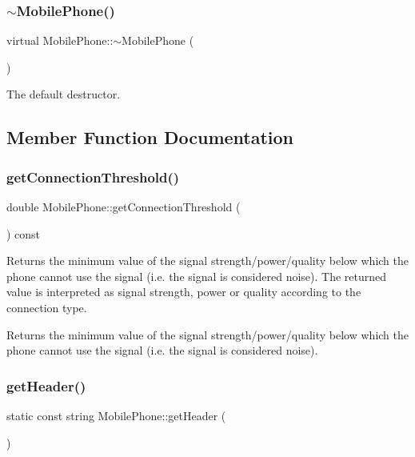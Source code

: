 \subsubsection{\texorpdfstring{$\sim$\+Mobile\+Phone()}{~MobilePhone()}}
{\footnotesize\ttfamily virtual Mobile\+Phone\+::$\sim$\+Mobile\+Phone (\begin{DoxyParamCaption}{ }\end{DoxyParamCaption})\hspace{0.3cm}{\ttfamily [virtual]}}

The default destructor. 

\subsection{Member Function Documentation}
\mbox{\label{class_mobile_phone_a57475711a8f85086f50067d219f1181d}} 
\subsubsection{\texorpdfstring{get\+Connection\+Threshold()}{getConnectionThreshold()}}
{\footnotesize\ttfamily double Mobile\+Phone\+::get\+Connection\+Threshold (\begin{DoxyParamCaption}{ }\end{DoxyParamCaption}) const}

Returns the minimum value of the signal strength/power/quality below which the phone cannot use the signal (i.\+e. the signal is considered noise). The returned value is interpreted as signal strength, power or quality according to the connection type. \begin{DoxyReturn}{Returns}
the minimum value of the signal strength/power/quality below which the phone cannot use the signal (i.\+e. the signal is considered noise). 
\end{DoxyReturn}
\mbox{\label{class_mobile_phone_a38cabfd91b77cd839f497facb9ed937c}} 
\subsubsection{\texorpdfstring{get\+Header()}{getHeader()}}
{\footnotesize\ttfamily static const string Mobile\+Phone\+::get\+Header (\begin{DoxyParamCaption}{ }\end{DoxyParamCaption})\hspace{0.3cm}{\ttfamily [static]}}

